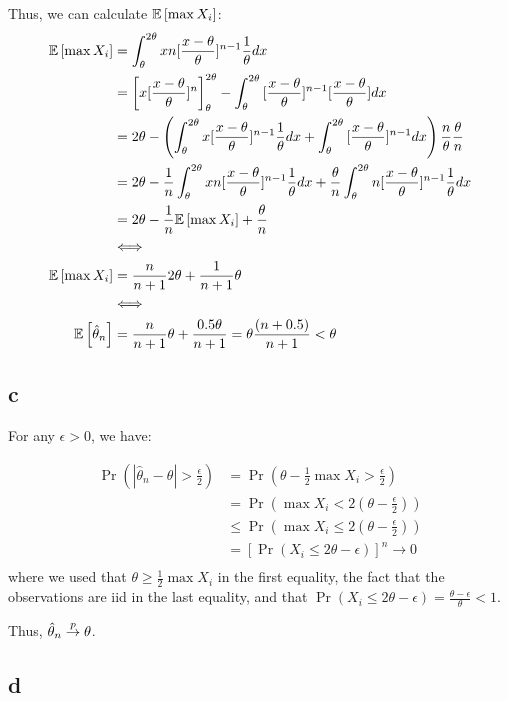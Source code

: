 \documentclass[12pt]{paper}
\begin{document}
Thus, we can calculate $\mathbb{E} \left [ \max{X_i} \right ]$:
\begin{align*}
\mathbb{E} \left [ \max{X_i} \right ]&=\int^{2\theta}_{\theta}{xn[\frac{x-\theta}{\theta}]^{n-1}\frac{1}{\theta}dx}\\
&=\left[x[\frac{x-\theta}{\theta}]^n\right]^{2\theta}_{\theta}-\int^{2\theta}_{\theta}{[\frac{x-\theta}{\theta}]^{n-1}[\frac{x-\theta}{\theta}]dx}\\
&=2\theta-\left(\int^{2\theta}_{\theta}{x[\frac{x-\theta}{\theta}]^{n-1}\frac{1}{\theta}dx}+\int^{2\theta}_{\theta}{[\frac{x-\theta}{\theta}]^{n-1}dx}\right)\frac{n}{\theta}\frac{\theta}{n}\\
&=2\theta-\frac{1}{n}\int^{2\theta}_{\theta}{xn[\frac{x-\theta}{\theta}]^{n-1}\frac{1}{\theta}dx}+\frac{\theta}{n}\int^{2\theta}_{\theta}{n[\frac{x-\theta}{\theta}]^{n-1}\frac{1}{\theta}dx}\\
&=2\theta-\frac{1}{n}\mathbb{E} \left [ \max{X_i} \right ]+\frac{\theta}{n}\\
&\Longleftrightarrow\\
\mathbb{E} \left [ \max{X_i} \right ]&=\frac{n}{n+1}2\theta+\frac{1}{n+1}\theta\\
&\Longleftrightarrow\\
\mathbb{E} \left [ \hat{\theta}_n \right ]&=\frac{n}{n+1}\theta+\frac{0.5\theta}{n+1}=\theta\frac{(n+0.5)}{n+1}<\theta
\end{align*}

\subsection*{c}

For any $\epsilon>0$, we have:

\begin{align*}
\Pr(|\hat{\theta}_n-\theta|>\frac{\epsilon}{2})&=\Pr(\theta-\frac{1}{2}\max{X_i}>\frac{\epsilon}{2})\\
&=\Pr(\max{X_i}<2(\theta-\frac{\epsilon}{2}))\\
&\le\Pr(\max{X_i}\le2(\theta-\frac{\epsilon}{2}))\\
&=[\Pr(X_i\le2\theta-\epsilon)]^n\to0\\
\end{align*}
\noindent where we used that $\theta\ge\frac{1}{2}\max{X_i}$ in the first equality, the fact that the observations are iid in the last equality, and that $\Pr(X_i\le2\theta-\epsilon)=\frac{\theta-\epsilon}{\theta}<1$.

Thus, $\hat{\theta}_n\overset{p}{\to}\theta$.

\subsection*{d}
\end{document}
